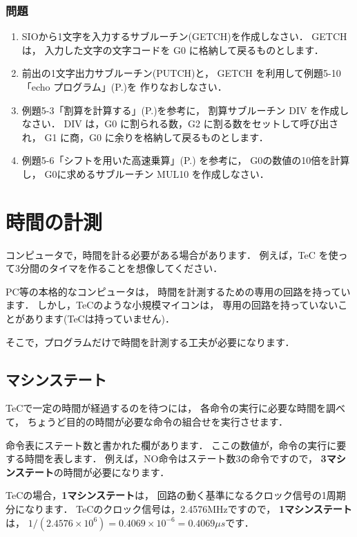\subsubsection{問題}
\begin{enumerate}
\item SIOから1文字を入力するサブルーチン(GETCH)を作成しなさい．
GETCH は，
入力した文字の文字コードを G0 に格納して戻るものとします．
\item 前出の1文字出力サブルーチン(PUTCH)と，
GETCH を利用して例題5-10「echo プログラム」(P.\pageref{rei:5_10})を
作りなおしなさい．
\item 例題5-3「割算を計算する」(P.\pageref{rei:5_3})を参考に，
割算サブルーチン DIV を作成しなさい．
DIV は，G0 に割られる数，G2 に割る数をセットして呼び出され，
G1 に商，G0 に余りを格納して戻るものとします．
\item 例題5-6「シフトを用いた高速乗算」(P.\pageref{rei:5_6}) を参考に，
G0の数値の10倍を計算し，
G0に求めるサブルーチン MUL10 を作成しなさい．
\end{enumerate}

\newpage
\section{時間の計測}

コンピュータで，時間を計る必要がある場合があります．
例えば，TeC を使って3分間のタイマを作ることを想像してください．

PC等の本格的なコンピュータは，
時間を計測するための専用の回路を持っています．
しかし，TeCのような小規模マイコンは，
専用の回路を持っていないことがあります(TeCは持っていません)．

そこで，プログラムだけで時間を計測する工夫が必要になります．

\subsection{マシンステート}

TeCで一定の時間が経過するのを待つには，
各命令の実行に必要な時間を調べて，
ちょうど目的の時間が必要な命令の組合せを実行させます．

命令表にステート数と書かれた欄があります．
ここの数値が，命令の実行に要する時間を表します．
例えば，NO命令はステート数3の命令ですので，
{\bf 3マシンステート}の時間が必要になります．

TeCの場合，{\bf 1マシンステート}は，
回路の動く基準になるクロック信号の1周期分になります．
TeCのクロック信号は，2.4576MHzですので，
{\bf 1マシンステート}は，
$1/(2.4576\times10^6) = 0.4069\times10^{-6} = 0.4069 \mu s$です．

